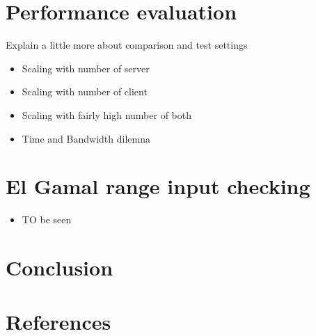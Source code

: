 \documentclass{article}
\begin{document}
\section*{Performance evaluation}

Explain a little more about comparison and test settings


\begin{itemize}


\item Scaling with number of server
\item Scaling with number of client
\item Scaling with fairly high number of both 
\item Time and Bandwidth dilemna

\end{itemize}
\section*{El Gamal range input checking}
\begin{itemize}

\item TO be seen
\end{itemize}
\appendix
\newpage

\newpage
\section*{Conclusion}

\newpage
\section*{References}
\end{document}
